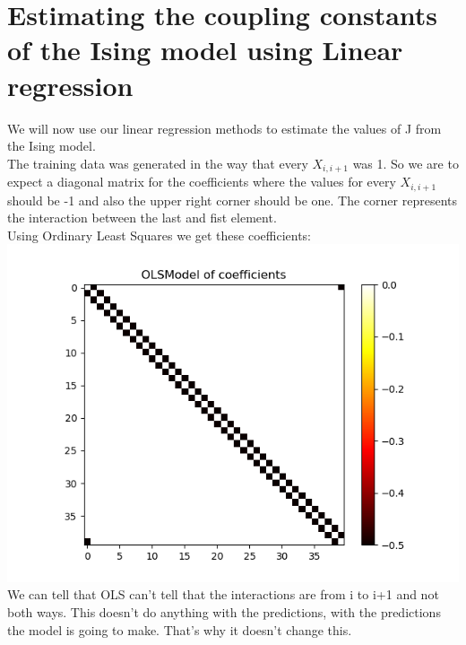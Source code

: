 \documentclass[a4paper,norsk]{article}
\begin{document}
\clearpage
\section{Estimating the coupling constants of the Ising model using Linear regression}
We will now use our linear regression methods to estimate the values of J from the Ising model.\\
The training data was generated in the way that every $X_{i, i+1}$ was 1. So we are to expect a diagonal matrix for the coefficients where the values for every $X_{i, i+1}$ should be -1 and also the upper right corner should be one. The corner represents the interaction between the last and fist element.\\
Using Ordinary Least Squares we get these coefficients:\\
\includegraphics[scale=.7]{images/OLScoef}\\
We can tell that OLS can't tell that the interactions are from i to i+1 and not both ways. This doesn't do anything with the predictions, with the predictions the model is going to make. That's why it doesn't change this.
\end{document}
